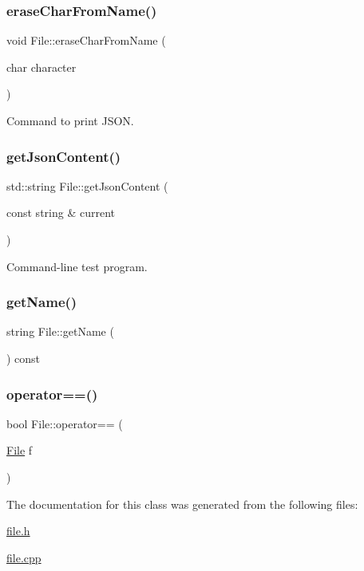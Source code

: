 \subsubsection{\texorpdfstring{erase\+Char\+From\+Name()}{eraseCharFromName()}}
{\footnotesize\ttfamily void File\+::erase\+Char\+From\+Name (\begin{DoxyParamCaption}\item[{char}]{character }\end{DoxyParamCaption})\hspace{0.3cm}{\ttfamily [inline]}}

Command to print J\+S\+ON. \mbox{\label{class_file_afaee512326a13dc99d6b8d08522eabe8}} 
\subsubsection{\texorpdfstring{get\+Json\+Content()}{getJsonContent()}}
{\footnotesize\ttfamily std\+::string File\+::get\+Json\+Content (\begin{DoxyParamCaption}\item[{const string \&}]{current }\end{DoxyParamCaption})}

Command-\/line test program. \mbox{\label{class_file_a4b6032847dfd076db8ed44a532387f07}} 
\subsubsection{\texorpdfstring{get\+Name()}{getName()}}
{\footnotesize\ttfamily string File\+::get\+Name (\begin{DoxyParamCaption}{ }\end{DoxyParamCaption}) const\hspace{0.3cm}{\ttfamily [inline]}}

\mbox{\label{class_file_aadbe64432e7e403f546ff35a3bfa8d97}} 
\subsubsection{\texorpdfstring{operator==()}{operator==()}}
{\footnotesize\ttfamily bool File\+::operator== (\begin{DoxyParamCaption}\item[{\hyperlink{class_file}{File}}]{f }\end{DoxyParamCaption})\hspace{0.3cm}{\ttfamily [inline]}}



The documentation for this class was generated from the following files\+:\begin{DoxyCompactItemize}
\item 
\hyperlink{file_8h}{file.\+h}\item 
\hyperlink{file_8cpp}{file.\+cpp}\end{DoxyCompactItemize}
